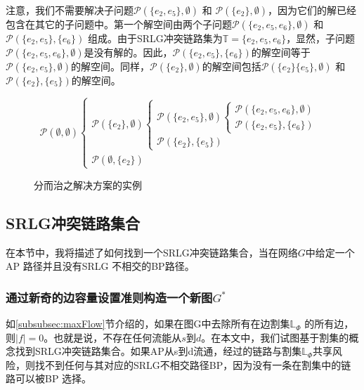 注意，我们不需要解决子问题${{\mathcal{P}}(\{ e_2,e_5\}, \emptyset)}$ 和 ${{\mathcal{P}}(\{ e_2\},\emptyset )}$，因为它们的解已经包含在其它的子问题中。第一个解空间由两个子问题${{\mathcal P}(\{ e_2,e_5,e_6\} ,\emptyset )}$ 和 ${{\mathcal P}(\{ e_2,e_5\} ,\{ e_6\} )}$ 组成。由于SRLG冲突链路集为$\mathbb{T}=\{e_2,e_5,e_6\}$，显然，子问题${{\mathcal P}(\{ e_2,e_5,e_6\} ,\emptyset )}$是没有解的。因此，${{\mathcal P}(\{ e_2,e_5\} ,\{ e_6\} )}$的解空间等于${{\mathcal{P}}(\{ e_2, e_5\}, \emptyset)}$的解空间。同样，${{\mathcal{P}}(\{ e_2\},\emptyset )}$的解空间包括${{\mathcal{P}}(\{ e_2\} \{ e_5\}, \emptyset)}$  和 ${{\mathcal{P}}(\{ e_2\} ,\{ e_5\} )}$的解空间。
\begin{figure}[htbp]
\large{
\begin{equation*}
{\mathcal P}(\emptyset ,\emptyset )\left\{ {\begin{array}{*{20}{l}}
{{\mathcal P}(\{ e_2\} ,\emptyset )\left\{ {\begin{array}{*{20}{l}}
{{\mathcal P}(\{ e_2,e_5\} ,\emptyset )\left\{ {\begin{array}{*{20}{l}}
{{\mathcal P}(\{ e_2,e_5,e_6\} ,\emptyset )}\\
{\boxed{{\mathcal P}(\{ e_2,e_5\} ,\{ e_6\} )}}
\end{array}} \right.}\\
{\boxed{{\mathcal P}(\{ e_2\} ,\{ e_5\} )}}
\end{array}} \right.}\\
{\boxed{{\mathcal P}(\emptyset ,\{ e_2\} )}}
\end{array}} \right.
\end{equation*}
}
\caption{分而治之解决方案的实例}
\label{fig:DividedConquer}
\end{figure}




\subsection{SRLG冲突链路集合}
在本节中，我将描述了如何找到一个SRLG冲突链路集合，当在网络$G$中给定一个AP 路径并且没有SRLG 不相交的BP路径。
\subsubsection{通过新奇的边容量设置准则构造一个新图$G^*$}
如\ref{subsubsec:maxFlow}节介绍的，如果在图G中去除所有在边割集$\mathbb{\mathbb{L}}_{\Phi}$ 的所有边，则$|f| = 0$。也就是说，不存在任何流能从$s$到$d$。在本文中，我们试图基于割集的概念找到SRLG冲突链路集合。如果AP从s到d流通，经过的链路与割集$\mathbb{\mathbb{L}}_{\Phi}$共享风险，则找不到任何与其对应的SRLG不相交路径BP，因为没有一条在割集中的链路可以被BP 选择。

